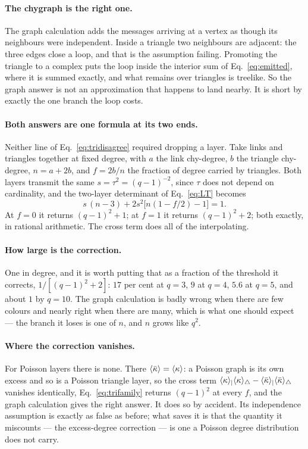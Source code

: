 \paragraph{The chygraph is the right one.} The graph calculation adds the
messages arriving at a vertex as though its neighbours were independent. Inside
a triangle two neighbours are adjacent: the three edges close a loop, and that
is the assumption failing. Promoting the triangle to a complex puts the loop
inside the interior sum of Eq.~\eqref{eq:emitted}, where it is summed exactly,
and what remains over triangles is treelike. So the graph answer is not an
approximation that happens to land nearby. It is short by exactly the one branch
the loop costs.

\paragraph{Both answers are one formula at its two ends.} Neither line of
Eq.~\eqref{eq:tridisagree} required dropping a layer. Take links and triangles
together at fixed degree, with $a$ the link chy-degree, $b$ the triangle
chy-degree, $n=a+2b$, and $f=2b/n$ the fraction of degree carried by triangles.
Both layers transmit the same $s=\tau^{2}=(q-1)^{-2}$, since $\tau$ does not
depend on cardinality, and the two-layer determinant of Eq.~\eqref{eq:LT}
becomes
\begin{equation}
  s\,(n-3)+2s^{2}\bigl[n(1-f/2)-1\bigr]=1.
  \label{eq:trifamily}
\end{equation}
At $f=0$ it returns $(q-1)^{2}+1$; at $f=1$ it returns $(q-1)^{2}+2$; both
exactly, in rational arithmetic. The cross term does all of the interpolating.

\paragraph{How large is the correction.} One in degree, and it is worth putting
that as a fraction of the threshold it corrects, $1/[(q-1)^{2}+2]$: $17$ per
cent at $q=3$, $9$ at $q=4$, $5.6$ at $q=5$, and about $1$ by $q=10$. The graph
calculation is badly wrong when there are few colours and nearly right when
there are many, which is what one should expect --- the branch it loses is one
of $n$, and $n$ grows like $q^{2}$.

\paragraph{Where the correction vanishes.} For Poisson layers there is none.
There $\langle \bar\kappa \rangle=\langle \kappa \rangle$: a Poisson graph is its own excess and so is a
Poisson triangle layer, so the cross term
$\langle \kappa \rangle_{|}\langle \kappa \rangle_{\triangle}-\langle \bar\kappa \rangle_{|}\langle \bar\kappa \rangle_{\triangle}$
vanishes identically, Eq.~\eqref{eq:trifamily} returns $(q-1)^{2}$ at every $f$,
and the graph calculation gives the right answer. It does so by accident. Its
independence assumption is exactly as false as before; what saves it is that the
quantity it miscounts --- the excess-degree correction --- is one a Poisson
degree distribution does not carry.

